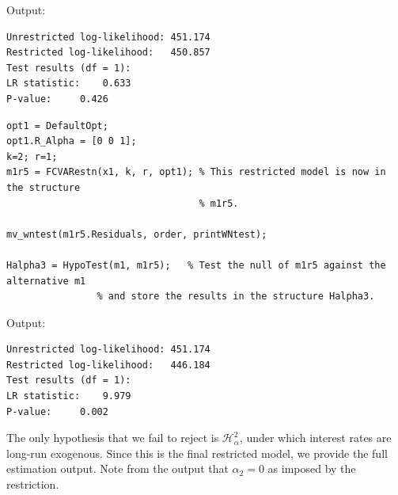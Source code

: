 \documentclass[10pt]{article}
\begin{document}
Output:

\begin{verbatim}
Unrestricted log-likelihood: 451.174
Restricted log-likelihood:   450.857
Test results (df = 1):
LR statistic: 	 0.633
P-value: 	 0.426
\end{verbatim}

\begin{lstlisting}[frame=single,caption={Hypothesis $\mathscr{H}_{\alpha}^3$}, label = Ha3]
%% Test restriction that unemployment is long-run exogenous.
opt1 = DefaultOpt;
opt1.R_Alpha = [0 0 1];
k=2; r=1;
m1r5 = FCVARestn(x1, k, r, opt1); % This restricted model is now in the structure 
                                  % m1r5.

mv_wntest(m1r5.Residuals, order, printWNtest);

Halpha3 = HypoTest(m1, m1r5); 	% Test the null of m1r5 against the alternative m1
				% and store the results in the structure Halpha3.
\end{lstlisting}

Output:

\begin{verbatim}
Unrestricted log-likelihood: 451.174
Restricted log-likelihood:   446.184
Test results (df = 1):
LR statistic: 	 9.979
P-value: 	 0.002
\end{verbatim}

The only hypothesis that we fail to reject is $\mathscr{H}_{\alpha}^2$, under which interest rates are long-run exogenous. Since this is the final restricted model, we provide the full estimation output. Note from the output that $\alpha_2 = 0$ as imposed by the restriction.
\end{document}
